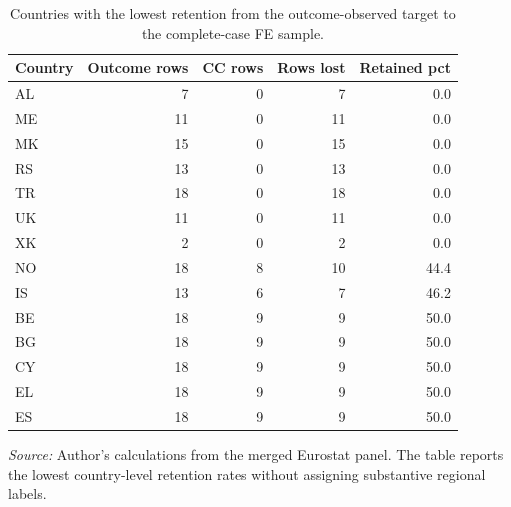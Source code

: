 \begin{table}[H]
\centering
\small
\caption{Countries with the lowest retention from the outcome-observed target to the complete-case FE sample.}
\label{tab:attrition_by_country_top_loss}
\begin{tabular}{@{}lrrrr@{}}
\toprule
Country & Outcome rows & CC rows & Rows lost & Retained pct \\
\midrule
AL & 7 & 0 & 7 & 0.0 \\
ME & 11 & 0 & 11 & 0.0 \\
MK & 15 & 0 & 15 & 0.0 \\
RS & 13 & 0 & 13 & 0.0 \\
TR & 18 & 0 & 18 & 0.0 \\
UK & 11 & 0 & 11 & 0.0 \\
XK & 2 & 0 & 2 & 0.0 \\
NO & 18 & 8 & 10 & 44.4 \\
IS & 13 & 6 & 7 & 46.2 \\
BE & 18 & 9 & 9 & 50.0 \\
BG & 18 & 9 & 9 & 50.0 \\
CY & 18 & 9 & 9 & 50.0 \\
EL & 18 & 9 & 9 & 50.0 \\
ES & 18 & 9 & 9 & 50.0 \\
\bottomrule
\end{tabular}

\vspace{0.2em}
\begin{minipage}{0.92\textwidth}\scriptsize \textit{Source:} Author's calculations from the merged Eurostat panel. The table reports the lowest country-level retention rates without assigning substantive regional labels.\end{minipage}
\end{table}
